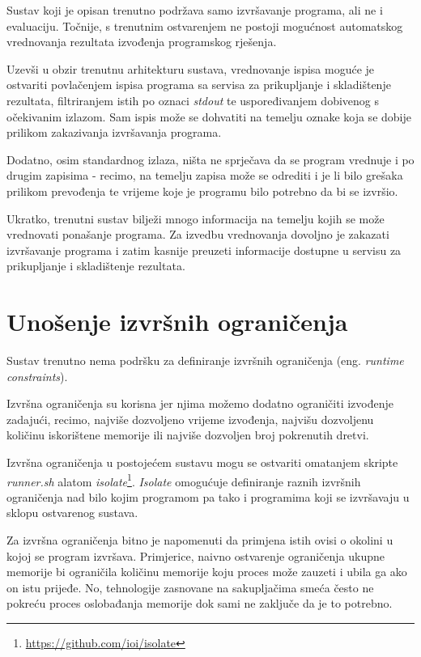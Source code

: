 \documentclass[times, utf8, zavrsni]{fer}
\begin{document}
{{Sustav koji je opisan trenutno podržava samo izvršavanje programa, ali ne i evaluaciju. Točnije, s trenutnim ostvarenjem ne postoji mogućnost automatskog vrednovanja rezultata izvođenja programskog rješenja.

Uzevši u obzir trenutnu arhitekturu sustava, vrednovanje ispisa moguće je ostvariti povlačenjem ispisa programa sa servisa za prikupljanje i skladištenje rezultata, filtriranjem istih po oznaci {\textit{stdout}} te uspoređivanjem dobivenog s očekivanim izlazom. Sam ispis može se dohvatiti na temelju oznake koja se dobije prilikom zakazivanja izvršavanja programa.

Dodatno, osim standardnog izlaza, ništa ne sprječava da se program vrednuje i po drugim zapisima - recimo, na temelju zapisa može se odrediti i je li bilo grešaka prilikom prevođenja te vrijeme koje je programu bilo potrebno da bi se izvršio.

Ukratko, trenutni sustav bilježi mnogo informacija na temelju kojih se može vrednovati ponašanje programa. Za izvedbu vrednovanja dovoljno je zakazati izvršavanje programa i zatim kasnije preuzeti informacije dostupne u servisu za prikupljanje i skladištenje rezultata.

\section{Unošenje izvršnih ograničenja}
\label{sec:runtimeconstraints}

Sustav trenutno nema podršku za definiranje izvršnih ograničenja (eng. {\textit{runtime constraints}}).

Izvršna ograničenja su korisna jer njima možemo dodatno ograničiti izvođenje zadajući, recimo, najviše dozvoljeno vrijeme izvođenja, najvišu dozvoljenu količinu iskorištene memorije ili najviše dozvoljen broj pokrenutih dretvi.

Izvršna ograničenja u postojećem sustavu mogu se ostvariti omatanjem skripte {\textit{runner.sh}} alatom {\textit{isolate}}\footnote{\url{https://github.com/ioi/isolate}}. {\textit{Isolate}} omogućuje definiranje raznih izvršnih ograničenja nad bilo kojim programom pa tako i programima koji se izvršavaju u sklopu ostvarenog sustava.

Za izvršna ograničenja bitno je napomenuti da primjena istih ovisi o okolini u kojoj se program izvršava. Primjerice, naivno ostvarenje ograničenja ukupne memorije bi ograničila količinu memorije koju proces može zauzeti i ubila ga ako on istu prijeđe. No, tehnologije zasnovane na sakupljačima smeća često ne pokreću proces oslobađanja memorije dok sami ne zaključe da je to potrebno.

}}
\end{document}

